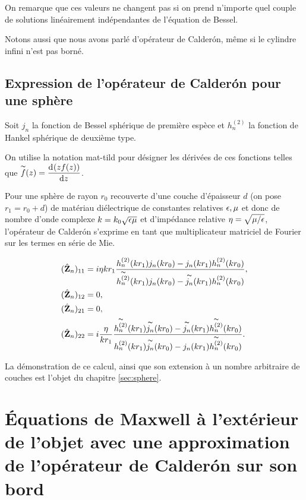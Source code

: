       On remarque que ces valeurs ne changent pas si on prend n'importe quel couple de solutions linéairement indépendantes de l'équation de Bessel.

      Notons aussi que nous avons parlé d'opérateur de Calderón, même si le cylindre infini n'est pas borné.

  \subsection{Expression de l'opérateur de Calderón pour une sphère}

    Soit \(j_n\) la fonction de Bessel sphérique de première espèce et \(h_n^{(2)}\) la fonction de Hankel sphérique de deuxième type.

    On utilise la notation \gls{mat-tild} pour désigner les dérivées de ces fonctions telles que \(\tilde{f}(z) = \ddp{z}{(zf(z))}\).

    Pour une sphère de rayon \(r_0\) recouverte d'une couche d'épaisseur \(d\) (on pose \(r_1=r_0 + d\)) de matériau diélectrique de constantes relatives \(\eps,\mu\) et donc de nombre d'onde complexe \(k = k_0\sqrt{\eps\mu}\) et d'impédance relative \(\eta=\sqrt{{\mu}/{\eps}}\), l'opérateur de Calderón s'exprime en tant que multiplicateur  matriciel de Fourier sur les termes en série de Mie.

    \begin{align*}
      (\hat \mZ_n)_{11} &=  i\eta kr_1 
        \frac{
          h^{(2)}_n(kr_1)j_n(kr_0)-j_n(kr_1)h^{(2)}_n(kr_0)
        }{
          \tilde{h^{(2)}_n}(kr_1)j_n(kr_0)-\tilde{j_n}(kr_1)h^{(2)}_n(kr_0)
        },
      \\
      (\hat \mZ_n)_{12} &= 0,
      \\
      (\hat \mZ_n)_{21} &= 0,
      \\
      (\hat \mZ_n)_{22} &= i \frac{\eta}{kr_1}
        \frac{
          \tilde{h^{(2)}_n}(kr_1)\tilde{j_n}(kr_0)-\tilde{j_n}(kr_1)\tilde{h^{(2)}_n}(kr_0)
        }{
          {h^{(2)}_n}(kr_1)\tilde{j_n}(kr_0)-{j_n}(kr_1)\tilde{h^{(2)}_n}(kr_0)
        }.
    \end{align*}

    La démonstration de ce calcul, ainsi que son extension à un nombre arbitraire de couches est l'objet du chapitre \ref{sec:sphere}.

\section[Problème extérieur et condition limite de Calderón]{Équations de Maxwell à l'extérieur de l'objet avec une approximation de l'opérateur de Calderón sur son bord}

